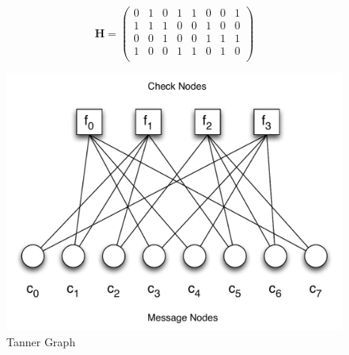 \documentclass[11pt]{article}
\numberwithin{equation}{subsection}
\begin{document}
\begin{equation} \label{8,4 code} 
\mathbf{H} = 
\left(
\begin{array}{cccccccc}
  0 & 1 & 0 & 1 & 1 & 0 & 0 & 1 \\
  1 & 1 & 1 & 0 & 0 & 1 & 0 & 0 \\
  0 & 0 & 1 & 0 & 0 & 1 & 1 & 1 \\
  1 & 0 & 0 & 1 & 1 & 0 & 1 & 0 \\
\end{array}
\right)
\end{equation}

\begin{figure}[h]
\centering
\includegraphics[scale=0.6]{tannergraph}
\caption{Tanner Graph}
\label{figure:tanner graph}
\end{figure}
\end{document}
